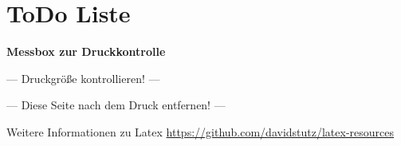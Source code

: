 \chapter{ToDo Liste}


\centering \Large \textbf{Messbox zur Druckkontrolle}

\begin{center}
	{\Large --- Druckgröße kontrollieren! ---}
	
	\bigskip
	
	
	\bigskip
	
	{\Large --- Diese Seite nach dem Druck entfernen! ---}
	
\end{center}

Weitere Informationen zu Latex
\url{https://github.com/davidstutz/latex-resources}